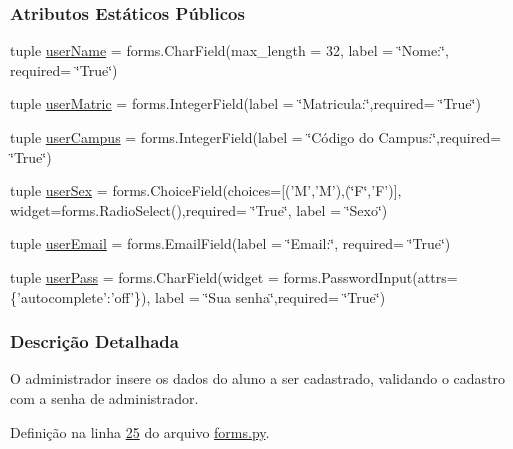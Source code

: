 \subsubsection*{Atributos Estáticos Públicos}
\begin{DoxyCompactItemize}
\item 
tuple \hyperlink{classAdm_1_1forms_1_1AdmRegStu__ProfForm_a4e5391112a173e2d304e20c2cc8bca4d}{user\-Name} = forms.\-Char\-Field(max\-\_\-length = 32, label = \char`\"{}Nome\-:\char`\"{}, required= \char`\"{}True\char`\"{})
\item 
tuple \hyperlink{classAdm_1_1forms_1_1AdmRegStu__ProfForm_a8cd50b9437effd2fecd6e4c66c307e41}{user\-Matric} = forms.\-Integer\-Field(label = \char`\"{}Matricula\-:\char`\"{},required= \char`\"{}True\char`\"{})
\item 
tuple \hyperlink{classAdm_1_1forms_1_1AdmRegStu__ProfForm_a885786ae8be597f051f8e3ff65ddb02d}{user\-Campus} = forms.\-Integer\-Field(label = \char`\"{}Código do Campus\-:\char`\"{},required= \char`\"{}True\char`\"{})
\item 
tuple \hyperlink{classAdm_1_1forms_1_1AdmRegStu__ProfForm_af8e16ffbc31dfdec8496b7751bb51bed}{user\-Sex} = forms.\-Choice\-Field(choices=\mbox{[}('M','M'),(\char`\"{}F\char`\"{},'F')\mbox{]}, widget=forms.\-Radio\-Select(),required= \char`\"{}True\char`\"{}, label = \char`\"{}Sexo\char`\"{})
\item 
tuple \hyperlink{classAdm_1_1forms_1_1AdmRegStu__ProfForm_a97ccca87a1c1c3a223e13d51e8196ef4}{user\-Email} = forms.\-Email\-Field(label = \char`\"{}Email\-:\char`\"{}, required= \char`\"{}True\char`\"{})
\item 
tuple \hyperlink{classAdm_1_1forms_1_1AdmRegStu__ProfForm_ad50fce73918c911541bd1c385d25eeca}{user\-Pass} = forms.\-Char\-Field(widget = forms.\-Password\-Input(attrs=\{'autocomplete'\-:'off'\}), label = \char`\"{}Sua senha\char`\"{},required= \char`\"{}True\char`\"{})
\end{DoxyCompactItemize}


\subsubsection{Descrição Detalhada}
O administrador insere os dados do aluno a ser cadastrado, validando o cadastro com a senha de administrador. 

Definição na linha \hyperlink{Adm_2forms_8py_source_l00025}{25} do arquivo \hyperlink{Adm_2forms_8py_source}{forms.\-py}.



